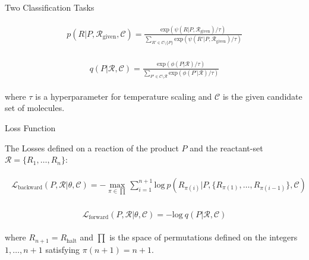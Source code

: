 \documentclass{beamer}		%
\begin{document}
\begin{frame}{Two Classification Tasks}

\begin{eqnarray*}
\begin{aligned}
p(R|P, \mathcal{R}_{\text{given}}, \mathcal{C}) = \frac{\text{exp}(\psi(R|P,\mathcal{R}_{\text{given}})/\tau)}{\sum_{R' \in \mathcal{C}\setminus\{P\}} \text{exp}(\psi(R'|P, \mathcal{R}_{\text{given}})/\tau)}
\end{aligned}    
\end{eqnarray*}

\begin{eqnarray*}
\begin{aligned}
q(P|\mathcal{R}, \mathcal{C}) = \frac{\text{exp}(\phi(P|\mathcal{R})/\tau)}{\sum_{P' \in \mathcal{C}\setminus\mathcal{R}} \text{exp}(\phi(P'|\mathcal{R})/\tau)}
\end{aligned}    
\end{eqnarray*}

where $\tau$ is a hyperparameter for temperature scaling and $\mathcal{C}$ is the given candidate set of molecules.

\end{frame}



\begin{frame}{Loss Function}

The Losses defined on a reaction of the product $P$ and the reactant-set $\mathcal{R}=\{R_1,\ldots,R_n\}$:

\begin{eqnarray*}
\begin{aligned}
\mathcal{L}_{\text{backward}}(P, \mathcal{R}|\theta, \mathcal{C}) = -\max_{\pi \in \prod} \sum_{i=1}^{n+1} \text{log} \ p(R_{\pi(i)}|P, \{R_{\pi(1)}, \ldots, R_{\pi(i-1)}\}, \mathcal{C})
\end{aligned}    
\end{eqnarray*}

\begin{eqnarray*}
\begin{aligned}
\mathcal{L}_{\text{forward}}(P, \mathcal{R}|\theta, \mathcal{C}) = -\text{log} \  q(P|\mathcal{R}, \mathcal{C})
\end{aligned}    
\end{eqnarray*}

where $R_{n+1}=R_{\text{halt}}$ and $\prod$ is the space of permutations defined on the integers $1, \ldots, n+1$ satisfying $\pi(n+1)=n+1$.

\end{frame}
\end{document}
